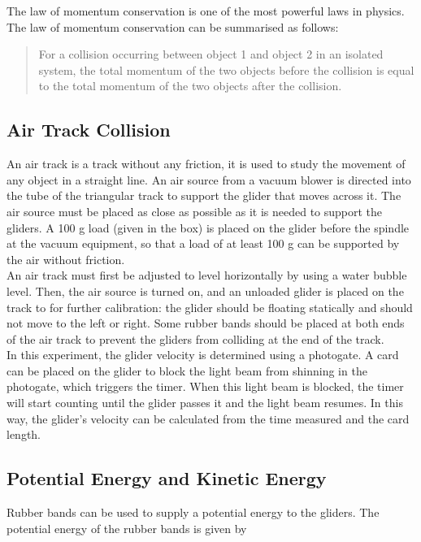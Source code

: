 \documentclass[a4paper,11pt]{article}
\begin{document}
The law of momentum conservation is one of the most powerful laws in physics. The law of momentum conservation can be summarised as follows:

\begin{quote}
For a collision occurring between object 1 and object 2 in an isolated system, the total momentum of the two objects before the collision is equal to the total momentum of the two objects after the collision.
\end{quote}

\subsection*{Air Track Collision}
An air track is a track without any friction, it is used to study the movement of any object in a straight line. An air source from a vacuum blower is directed into the tube of the triangular track to support the glider that moves across it. The air source must be placed as close as possible as it is needed to support the gliders. A 100 g load (given in the box) is placed on the glider before the spindle at the vacuum equipment, so that a load of at least 100 g can be supported by the air without friction.
\\

An air track must first be adjusted to level horizontally by using a water bubble level. Then, the air source is turned on, and an unloaded glider is placed on the track to for further calibration: the glider should be floating statically and should not move to the left or right. Some rubber bands should be placed at both ends of the air track to prevent the gliders from colliding at the end of the track.
\\

In this experiment, the glider velocity is determined using a photogate. A card can be 
placed on the glider to block the light beam from shinning in the photogate, which triggers the 
timer. When this light beam is blocked, the timer will start counting until the glider passes it
and the light beam resumes. In this way, the glider’s velocity can be calculated from the time 
measured and the card length.
\subsection*{Potential Energy and Kinetic Energy}
Rubber bands can be used to supply a potential energy to the gliders. The potential energy of 
the rubber bands is given by
\end{document}
